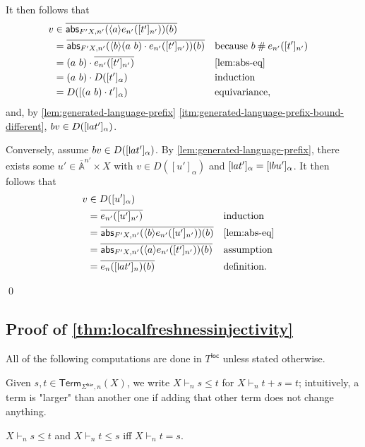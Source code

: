 \documentclass[a4paper,UKenglish,cleveref,thm-restate,numberwithinsect,final]{lipics-v2021}
\newcommand{\Br}{\mathsf{bar}}
\newcommand{\abs}{\mathsf{abs}}
\newcommand{\Term}{\mathsf{Term}}
\newcommand{\loc}{\mathsf{loc}}
\newcommand{\Names}{\mathbb{A}}
\newcommand{\barNames}{\overline{\Names}}
\newcommand{\fresh}{\mathbin{\#}}
\newcommand{\bind}[1]{\langle #1\rangle}
\theoremstyle{plain}
\newcommand{\midmid}{\hspace{0.2ex}{\rule[-0.1ex]{0.6pt}{1.65ex}}\hspace{0.2ex}}
\newcommand{\newletter}[1]{{\midmid}#1}
\numberwithin{equation}{section}
\newcommand{\+}[1]{\mathcal{#1}\xspace}
\theoremstyle{definition}
\begin{document}
\begin{itemize}
    It then follows that
    \begin{align*}
      v &\in \overline{\abs_{F'X, n'}(\bind{a} e_{n'}([t']_{n'}))(b)} \\
      &= \overline{\abs_{F'X, n'}(\bind{b}(a\ b) \cdot e_{n'}([t']_{n'}))(b)} && \text{because } b \fresh e_{n'}([t']_{n'})  \\
      &= (a\ b) \cdot \overline{e_{n'}([t']_{n'})} && \text{\cref{lem:abs-eq}} \\
      &= (a\ b) \cdot D([t']_\alpha) && \text{induction} \\
      &= D([(a\ b) \cdot t']_\alpha) && \text{equivariance},
    \end{align*}
    and, by \cref{lem:generated-language-prefix} \eqref{itm:generated-language-prefix-bound-different}, \(bv \in D([\newletter{a}t']_\alpha)\).

    Conversely, assume \(bv \in D([\newletter{a}t']_\alpha)\).
    By \cref{lem:generated-language-prefix}, there exists some \(u' \in \barNames^{n'} \times X\) with \(v \in D([u']_\alpha)\) and \([\newletter{a}t']_\alpha = [\newletter{b}u']_\alpha\).
    It then follows that
    \begin{align*}
      v &\in D([u']_\alpha) \\
      &= \overline{e_{n'}([u']_{n'})} && \text{induction} \\
      &= \overline{\abs_{F'X, n'}(\bind{b} e_{n'}([u']_{n'}))(b)} && \text{\cref{lem:abs-eq}} \\
      &= \overline{\abs_{F'X, n'}(\bind{a} e_{n'}([t']_{n'}))(b)} && \text{assumption} \\
      &= \overline{e_n([\newletter{a}t']_n)(b)} && \text{definition}.
    \end{align*}
\end{itemize}\qed

\subsection*{Proof of \cref{thm:localfreshnessinjectivity}}

All of the following computations are done in \(T^\loc\) unless stated otherwise.

Given \(s, t \in \Term_{\Sigma^\Br, n}(X)\), we write \(X \vdash_n s \le t\) for \(X \vdash_n t + s = t\); intuitively, a term is "larger" than another one if adding that other term does not change anything.

\begin{lemma}\label{lem:derivable-inequality-equal}
  \(X \vdash_n s \le t\) and \(X \vdash_n t \le s\) iff \(X \vdash_n t = s\).
\end{lemma}
\end{document}
